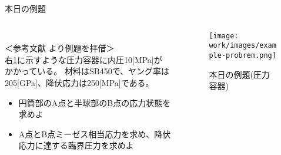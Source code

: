 \begin{frame}{本日の例題}
 
    \begin{columns}[t]
    \begin{column}{0.65\textwidth}
        \\
        ＜参考文献\cite{wanted} より例題を拝借＞ \\
	    右\figurename \ref{fig:example-probrem}に示すような圧力容器に内圧10[\si{\mega\pascal}]が \\
        かかっている。
        材料はSB450で、ヤング率は205[\si{\giga\pascal}]、降伏応力は250[\si{\mega\pascal}]である。 \\
         \Add{[後述]}
        \begin{itemize}
          \item[①]{円筒部のA点と半球部のB点の応力状態を求めよ}
          \item[②]{A点とB点ミーゼス相当応力を求め、降伏応力に達する臨界圧力を求めよ}
        \end{itemize}
    \end{column}
    \begin{column}{0.35\textwidth}
      \begin{figure}[htbp]
        \begin{center}
          \texttt{[image: work/images/example-probrem.png]}
            \caption{本日の例題(圧力容器)} \label{fig:example-probrem}
        \end{center}
      \end{figure}
    \end{column}
  \end{columns}
\end{frame}
